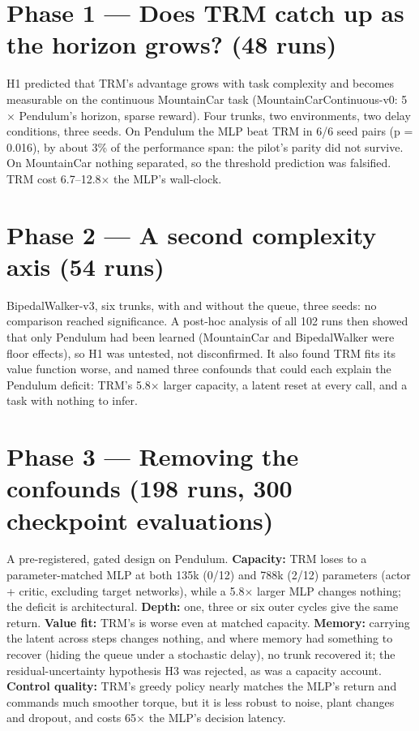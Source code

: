 \documentclass[11pt]{article}
\begin{document}
\section*{Phase 1 --- Does TRM catch up as the horizon grows? (48 runs)}



H1 predicted that TRM's advantage grows with task complexity and becomes measurable on the continuous MountainCar task (MountainCarContinuous-v0: 5$\times$ Pendulum's horizon, sparse reward). Four trunks, two environments, two delay conditions, three seeds. On Pendulum the MLP beat TRM in 6/6 seed pairs (p = 0.016), by about 3\% of the performance span: the pilot's parity did not survive. On MountainCar nothing separated, so the threshold prediction was falsified. TRM cost 6.7--12.8$\times$ the MLP's wall-clock.



\section*{Phase 2 --- A second complexity axis (54 runs)}



BipedalWalker-v3, six trunks, with and without the queue, three seeds: no comparison reached significance. A post-hoc analysis of all 102 runs then showed that only Pendulum had been learned (MountainCar and BipedalWalker were floor effects), so H1 was untested, not disconfirmed. It also found TRM fits its value function worse, and named three confounds that could each explain the Pendulum deficit: TRM's 5.8$\times$ larger capacity, a latent reset at every call, and a task with nothing to infer.



\section*{Phase 3 --- Removing the confounds (198 runs, 300 checkpoint evaluations)}



A pre-registered, gated design on Pendulum. \textbf{Capacity:} TRM loses to a parameter-matched MLP at both 135k (0/12) and 788k (2/12) parameters (actor + critic, excluding target networks), while a 5.8$\times$ larger MLP changes nothing; the deficit is architectural. \textbf{Depth:} one, three or six outer cycles give the same return. \textbf{Value fit:} TRM's is worse even at matched capacity. \textbf{Memory:} carrying the latent across steps changes nothing, and where memory had something to recover (hiding the queue under a stochastic delay), no trunk recovered it; the residual-uncertainty hypothesis H3 was rejected, as was a capacity account. \textbf{Control quality:} TRM's greedy policy nearly matches the MLP's return and commands much smoother torque, but it is less robust to noise, plant changes and dropout, and costs 65$\times$ the MLP's decision latency.
\end{document}
